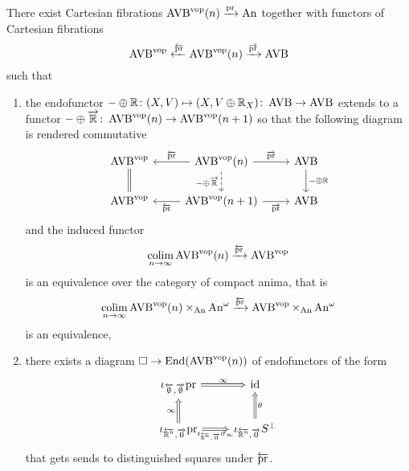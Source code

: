\begin{proposition}\label{prop: AVB(n)}
 There exist Cartesian fibrations $\operatorname{AVB}^{\mathrm{vop}}(n) \xrightarrow{\mathrm{pr}} \operatorname{An}$ together with functors of 
 Cartesian fibrations 
 \[
   \operatorname{AVB}^{\mathrm{vop}} \xleftarrow{\overleftarrow{\mathrm{pr}}} \operatorname{AVB}^{\mathrm{vop}}(n) \xrightarrow{\overrightarrow{\mathrm{pr}}} \operatorname{AVB} 
 \]
 such that
 \begin{enumerate}
    \item the endofunctor $- \oplus \mathbb{R} \colon (X,V) \mapsto (X, V \oplus \mathbb{R}_X) \colon \operatorname{AVB} \to \operatorname{AVB}$ extends to a
    functor $- \oplus \overrightarrow{\mathbb{R}} \colon \operatorname{AVB}^{\mathrm{vop}}(n) \to \operatorname{AVB}^{\mathrm{vop}}(n + 1)$ so that the following diagram is 
    rendered commutative 
    \[\begin{tikzcd}
        {\AVB^\vop} & {\AVB^\vop(n)} & \AVB \\
        {\AVB^\vop} & {\AVB^\vop(n + 1)} & \AVB
        \arrow["{ -\oplus\overrightarrow{\R}}"', dashed, from=1-2, to=2-2]
        \arrow["{\overrightarrow{\pr}}", from=1-2, to=1-3]
        \arrow["{\overrightarrow{\pr}}"', from=2-2, to=2-3]
        \arrow["{ - \oplus \R}", from=1-3, to=2-3]
        \arrow["{\overleftarrow{\pr}}"', from=1-2, to=1-1]
        \arrow["{\overleftarrow{\pr}}", from=2-2, to=2-1]
        \arrow[Rightarrow, no head, from=1-1, to=2-1]
        \label{}
    \end{tikzcd}\]
    and the induced functor 
    \[
      \operatorname*{colim}_{n \to \infty} \operatorname{AVB}^{\mathrm{vop}}(n) \xrightarrow{\overleftarrow{\mathrm{pr}}} \operatorname{AVB}^{\mathrm{vop}}   
    \]
    is an equivalence over the category of compact anima, that is 
    \[
        \operatorname*{colim}_{n \to \infty} \operatorname{AVB}^{\mathrm{vop}}(n) \times_{\operatorname{An}} \operatorname{An}^\omega \xrightarrow{\overleftarrow{\mathrm{pr}}} \operatorname{AVB}^{\mathrm{vop}} \times_{\operatorname{An}} \operatorname{An}^\omega
    \]
    is an equivalence, 
    \item there exists a diagram $\square \to \mathrm{End}(\operatorname{AVB}^{\mathrm{vop}}(n))$ of endofunctors  of the form 
    \begin{equation}
        \begin{tikzcd}
        {\iota_{\overleftarrow{\emptyset},\overrightarrow{\emptyset}}\pr} & \id \\
        {\iota_{\overleftarrow{\R^n},\overrightarrow{0}}\pr} & {\iota_{\overleftarrow{\R^n},\overrightarrow{0}}S^\perp}
        \arrow["\infty", Rightarrow, from=2-1, to=1-1]
        \arrow["\infty", Rightarrow, from=1-1, to=1-2]
        \arrow["{\iota_{\overleftarrow{\R^n},\overrightarrow{0}}\sigma_\infty}"', Rightarrow, from=2-1, to=2-2]
        \arrow["\theta"', Rightarrow, from=2-2, to=1-2]
    \end{tikzcd}
    \label{fig:endosquareavb(n)}
\end{equation}
    that gets sends to distinguished squares under $\overleftarrow{\mathrm{pr}}$.
 \end{enumerate}
\end{proposition}

